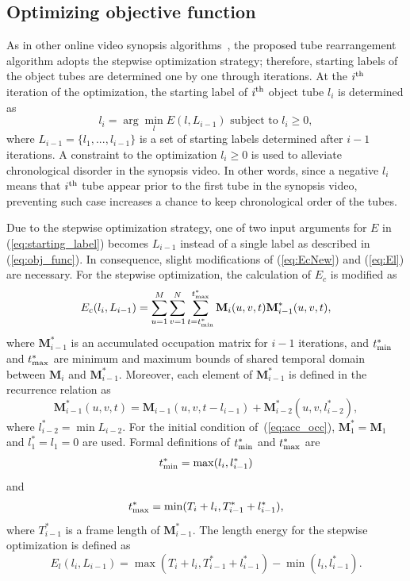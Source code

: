 \documentclass[11pt]{hyu_thesis}
\begin{document}
\subsection{Optimizing objective function}
As in other online video synopsis algorithms~\cite{}, the proposed tube rearrangement algorithm adopts the stepwise optimization strategy; therefore, starting labels of the object tubes are determined one by one through iterations. At the $i^{\rm{th}}$ iteration of the optimization, the starting label of $i^{\rm{th}}$ object tube $l_i$ is determined as
\begin{equation}
\label{eq:starting_label}
l_i = \arg\min_l E(l, L_{i-1}) \textrm{ subject to } l_i \geq 0,
\end{equation}
where $L_{i-1} = \{ {l}_{1},...,{l}_{i-1} \}$ is a set of starting labels determined after $i-1$ iterations. A constraint to the optimization ${l}_{i} \geq 0$ is used to alleviate chronological disorder in the synopsis video. In other words, since a negative $l_i$ means that $i^{\rm{th}}$ tube appear prior to the first tube in the synopsis video, preventing such case increases a chance to keep chronological order of the tubes. 

Due to the stepwise optimization strategy, one of two input arguments for $E$ in (\ref{eq:starting_label}) becomes $L_{i-1}$ instead of a single label as described in (\ref{eq:obj_func}). In consequence, slight modifications of (\ref{eq:EcNew}) and (\ref{eq:El}) are necessary. For the stepwise optimization, the calculation of $E_c$ is modified as
\begin{equation}
\label{eq:EcStepwise}
E_c(l_i,L_{i-1}) = \sum_{u=1}^{M}\sum_{v=1}^{N}\sum_{t=t_{\rm{min}}^{*}}^{t_{\rm{max}}^{*}} \textbf{M}_i(u,v,t)\textbf{M}_{i-1}^{*}(u,v,t),
\end{equation}
where $\textbf{M}_{i-1}^{*}$ is an accumulated occupation matrix for $i-1$ iterations, and $t_{\rm{min}}^{*}$ and $t_{\rm{max}}^{*}$ are minimum and maximum bounds of shared temporal domain between $\textbf{M}_i$ and $\textbf{M}_{i-1}^{*}$. Moreover, each element of $\textbf{M}_{i-1}^{*}$ is defined in the recurrence relation as
\begin{equation}
\label{eq:acc_occ}
\textbf{M}_{i-1}^{*}(u, v, t) = \textbf{M}_{i-1}(u, v, t - l_{i-1}) + \textbf{M}_{i-2}^{*}(u, v, l_{i-2}^{*}),
\end{equation}
where $l_{i-2}^{*} = \min L_{i-2}$. For the initial condition of~(\ref{eq:acc_occ}), $\textbf{M}_{1}^{*} = \textbf{M}_{1}$ and $l_{1}^{*} = l_{1} = 0$ are used. Formal definitions of $t_{\rm{min}}^{*}$ and $t_{\rm{max}}^{*}$ are
\begin{equation}
t_{\rm{min}}^{*} = \max(l_i, l_{i-1}^{*})
\end{equation}
and
\begin{equation}
t_{\rm{max}}^{*} = \min(T_i + l_i, T_{i-1}^{*} + l_{i-1}^{*}),
\end{equation}
where $T_{i-1}^{*}$ is a frame length of $\textbf{M}_{i-1}^{*}$. The length energy for the stepwise optimization is defined as
\begin{equation}
E_l(l_i,L_{i-1})=\max(T_i+l_i,T_{i-1}^{*}+l_{i-1}^{*})-\min(l_i,l_{i-1}^{*}).
\end{equation}
\end{document}
